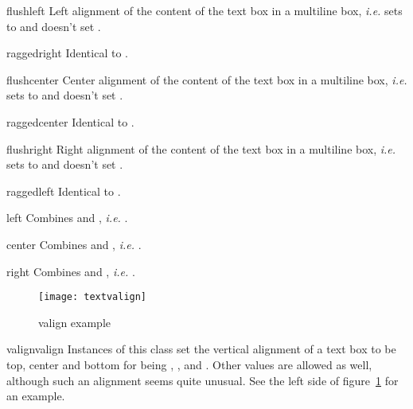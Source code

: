 \begin{memberdesc}{flushleft}
  Left alignment of the content of the text box in a multiline box,
  \emph{i.e.} sets  to  and doesn't set
  .
\end{memberdesc}

\begin{memberdesc}{raggedright}
  Identical to .
\end{memberdesc}

\begin{memberdesc}{flushcenter}
  Center alignment of the content of the text box in a multiline box,
  \emph{i.e.} sets  to  and doesn't set
  .
\end{memberdesc}

\begin{memberdesc}{raggedcenter}
  Identical to .
\end{memberdesc}

\begin{memberdesc}{flushright}
  Right alignment of the content of the text box in a multiline box,
  \emph{i.e.} sets  to  and doesn't set
  .
\end{memberdesc}

\begin{memberdesc}{raggedleft}
  Identical to .
\end{memberdesc}

\begin{memberdesc}{left}
  Combines  and , \emph{i.e.}
  .
\end{memberdesc}

\begin{memberdesc}{center}
  Combines  and , \emph{i.e.}
  .
\end{memberdesc}

\begin{memberdesc}{right}
  Combines  and , \emph{i.e.}
  .
\end{memberdesc}

\begin{figure}
\centerline{\texttt{[image: textvalign]}}
\caption{valign example}
\label{fig:textvalign}
\end{figure}

\begin{classdesc}{valign}{valign}
  Instances of this class set the vertical alignment of a text box to
  be top, center and bottom for  being ,
  , and . Other values are allowed as well, although
  such an alignment seems quite unusual. See the left side of
  figure~\ref{fig:textvalign} for an example.
\end{classdesc}

